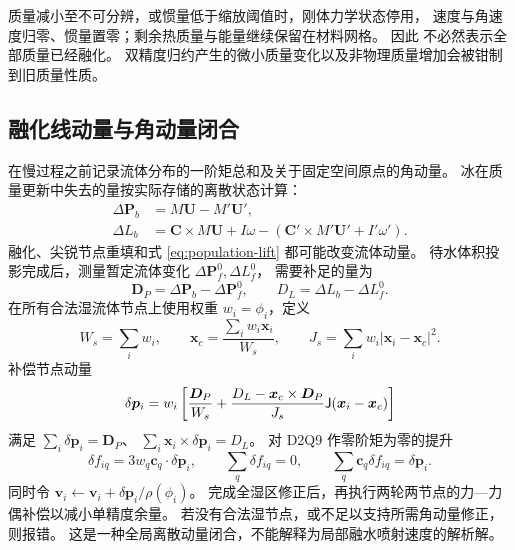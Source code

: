 质量减小至不可分辨，或惯量低于缩放阈值时，刚体力学状态停用，
速度与角速度归零、惯量置零；剩余热质量与能量继续保留在材料网格。
因此  不必然表示全部质量已经融化。
双精度归约产生的微小质量变化以及非物理质量增加会被钳制到旧质量性质。

\subsection{融化线动量与角动量闭合}
在慢过程之前记录流体分布的一阶矩总和及关于固定空间原点的角动量。
冰在质量更新中失去的量按实际存储的离散状态计算：
\begin{align}
 \Delta\bm P_b&=M\bm U-M'\bm U',\\
 \Delta L_b&=\bm C\times M\bm U+I\omega-
 (\bm C'\times M'\bm U'+I'\omega').
\end{align}
融化、尖锐节点重填和式 \eqref{eq:population-lift} 都可能改变流体动量。
待水体积投影完成后，测量暂定流体变化 $\Delta\bm P_f^0,\Delta L_f^0$，
需要补足的量为
\begin{equation}
 \bm D_P=\Delta\bm P_b-\Delta\bm P_f^0,\qquad
 D_L=\Delta L_b-\Delta L_f^0.
\end{equation}
在所有合法湿流体节点上使用权重 $w_i=\phi_i$，定义
\begin{equation}
 W_s=\sum_iw_i,\qquad
 \bm x_c=\frac{\sum_iw_i\bm x_i}{W_s},\qquad
 J_s=\sum_iw_i|\bm x_i-\bm x_c|^2.
\end{equation}
补偿节点动量
\begin{equation}
 \delta\bm p_i=w_i\left[\frac{\bm D_P}{W_s}+
 \frac{D_L-\bm x_c\times\bm D_P}{J_s}\mathsf J(\bm x_i-\bm x_c)\right]
 \label{eq:momentum-correction}
\end{equation}
满足 $\sum_i\delta\bm p_i=\bm D_P$、
$\sum_i\bm x_i\times\delta\bm p_i=D_L$。
对 D2Q9 作零阶矩为零的提升
\begin{equation}
 \delta f_{iq}=3w_q\bm c_q\cdot\delta\bm p_i,
 \qquad\sum_q\delta f_{iq}=0,\qquad
 \sum_q\bm c_q\delta f_{iq}=\delta\bm p_i.
\end{equation}
同时令 $\bm v_i\leftarrow\bm v_i+\delta\bm p_i/\rho(\phi_i)$。
完成全湿区修正后，再执行两轮两节点的力—力偶补偿以减小单精度余量。
若没有合法湿节点，或不足以支持所需角动量修正，则报错。
这是一种全局离散动量闭合，不能解释为局部融水喷射速度的解析解。


